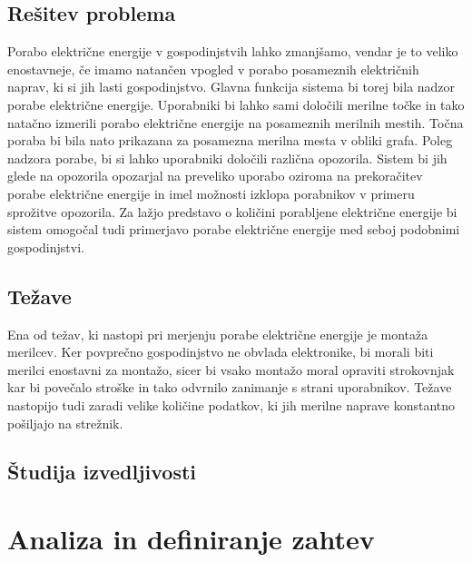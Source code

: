 \documentclass[12pt,a4paper,titlepage,openany]{report}
\begin{document}
\section{Rešitev problema}
\thispagestyle{fancy}


Porabo električne energije v gospodinjstvih lahko zmanjšamo, vendar je to veliko enostavneje, če imamo natančen vpogled v porabo posameznih električnih naprav, ki si jih lasti gospodinjstvo. Glavna funkcija sistema bi torej bila nadzor porabe električne energije. Uporabniki bi lahko sami določili merilne točke in tako natačno izmerili porabo električne energije na posameznih merilnih mestih. Točna poraba bi bila nato prikazana za posamezna merilna mesta v obliki grafa. Poleg nadzora porabe, bi si lahko uporabniki določili različna opozorila. Sistem bi jih glede na opozorila opozarjal na preveliko uporabo oziroma na prekoračitev porabe električne energije in imel možnosti izklopa porabnikov v primeru sprožitve opozorila. Za lažjo predstavo o količini porabljene električne energije bi sistem omogočal tudi primerjavo porabe električne energije med seboj podobnimi gospodinjstvi.

\section{Težave}
\thispagestyle{fancy}

Ena od težav, ki nastopi pri merjenju porabe električne energije je montaža merilcev. Ker povprečno gospodinjstvo ne obvlada elektronike, bi morali biti merilci enostavni za montažo, sicer bi vsako montažo moral opraviti strokovnjak kar bi povečalo stroške in tako odvrnilo zanimanje s strani uporabnikov. Težave nastopijo tudi zaradi velike količine podatkov, ki jih merilne naprave konstantno pošiljajo na strežnik. 

\section{Študija izvedljivosti}
\thispagestyle{fancy}


\chapter{Analiza in definiranje zahtev}
\thispagestyle{fancy}
\end{document}
